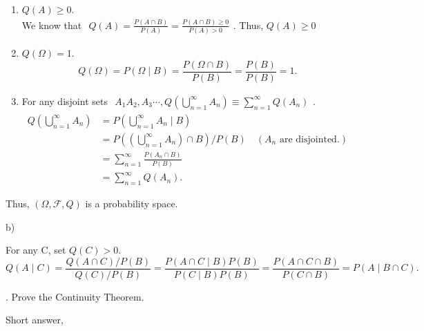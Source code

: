 \documentclass[12pt,thmsa]{article}
\begin{document}
\begin{enumerate}%
	\item \(Q(A) \geqslant 0\). \\
	We know that \(\begin{aligned} Q(A)=\frac{P(A \cap B)}{P(A)} = \frac{P(A \cap B) \geqslant 0}{P(A) > 0} \end{aligned}\). Thus, \( Q(A) \geqslant 0\)
	
	
	\item \(Q(\Omega)=1\). \\
	\[Q(\Omega)=P(\Omega \mid B)=\frac{P(\Omega \cap B)}{P(B)}=\frac{P(B)}{P(B)}=1.\]
	
	\item For any disjoint sets \( \begin{aligned} A_{1} A_{2}, A_{3} \cdots, Q\left(\bigcup_{n=1}^{\infty} A_{n}\right) \equiv \sum_{n=1}^{\infty} Q\left(A_{n}\right) \end{aligned}\).
	\[ \begin{aligned}
		Q\left(\bigcup_{n=1}^{\infty} A_{n}\right) &= P\left(\bigcup_{n=1}^{\infty} A_{n} \mid B\right) \\
		&=P\left(\left(\bigcup_{n=1}^{\infty} A_{n}\right) \cap B\right) / P(B) \quad (A_{n} \text{ are disjointed.}) \\
		&= \sum_{n=1}^{\infty} \frac{P\left(A_{n} \cap B\right)}{P(B)} \\
		&= \sum_{n=1}^{\infty} Q\left(A_{n}\right).
	\end{aligned}
	\]
\end{enumerate}

Thus, \((\Omega, \mathcal{F}, Q)\) is a probability space.

b)

For any C, set \(Q(C)>0\).
\[
Q(A \mid C)=\frac{Q(A \cap C) / P(B)}{Q(C)/ P(B)}=\frac{P(A \cap C \mid B) P(B)}{P(C \mid B) P(B)} = \frac{P(A \cap C \cap B)}{P(C \cap B) } = P(A \mid B \cap C).
\]

\medskip



. Prove the Continuity Theorem.

\noindent
Short answer,
\end{document}
